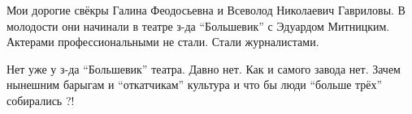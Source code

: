  
 
 
 
 


Мои дорогие свёкры Галина Феодосьевна и Всеволод Николаевич Гавриловы. В
молодости они начинали в театре з-да \enquote{Большевик} с Эдуардом Митницким. Актерами
профессиональными не стали. Стали журналистами.


Нет уже у з-да \enquote{Большевик} театра. Давно нет. Как и самого завода нет. Зачем
нынешним барыгам и \enquote{откатчикам} культура и что бы люди \enquote{больше трёх} собирались
?!

